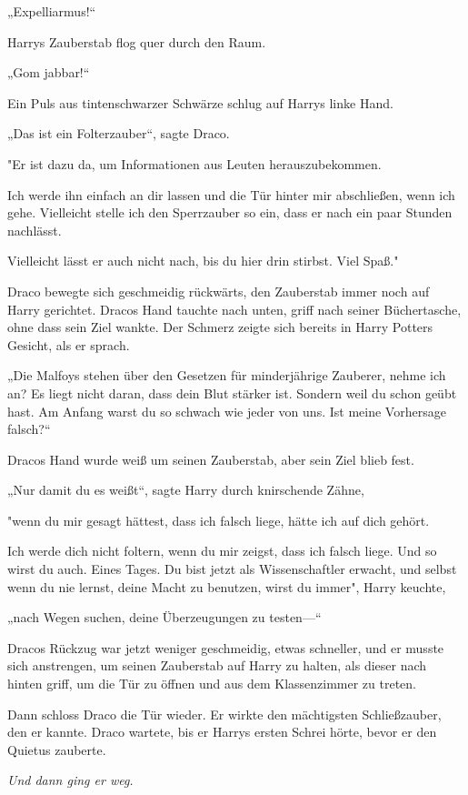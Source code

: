 {„Expelliarmus!“

Harrys Zauberstab flog quer durch den Raum.

„Gom jabbar!“

Ein Puls aus tintenschwarzer Schwärze schlug auf Harrys linke Hand.

„Das ist ein Folterzauber“, sagte Draco.

"Er ist dazu da, um Informationen aus Leuten herauszubekommen.

Ich werde ihn einfach an dir lassen und die Tür hinter mir abschließen, wenn ich gehe. Vielleicht stelle ich den Sperrzauber so ein, dass er nach ein paar Stunden nachlässt.

Vielleicht lässt er auch nicht nach, bis du hier drin stirbst. Viel Spaß."

Draco bewegte sich geschmeidig rückwärts, den Zauberstab immer noch auf Harry gerichtet. Dracos Hand tauchte nach unten, griff nach seiner Büchertasche, ohne dass sein Ziel wankte. Der Schmerz zeigte sich bereits in Harry Potters Gesicht, als er sprach.

„Die Malfoys stehen über den Gesetzen für minderjährige Zauberer, nehme ich an? Es liegt nicht daran, dass dein Blut stärker ist. Sondern weil du schon geübt hast. Am Anfang warst du so schwach wie jeder von uns. Ist meine Vorhersage falsch?“

Dracos Hand wurde weiß um seinen Zauberstab, aber sein Ziel blieb fest.

„Nur damit du es weißt“, sagte Harry durch knirschende Zähne,

"wenn du mir gesagt hättest, dass ich falsch liege, hätte ich auf dich gehört.

Ich werde dich nicht foltern, wenn du mir zeigst, dass ich falsch liege. Und so wirst du auch. Eines Tages. Du bist jetzt als Wissenschaftler erwacht, und selbst wenn du nie lernst, deine Macht zu benutzen, wirst du immer", Harry keuchte,

„nach Wegen suchen, deine Überzeugungen zu testen—“

Dracos Rückzug war jetzt weniger geschmeidig, etwas schneller, und er musste sich anstrengen, um seinen Zauberstab auf Harry zu halten, als dieser nach hinten griff, um die Tür zu öffnen und aus dem Klassenzimmer zu treten.

Dann schloss Draco die Tür wieder. Er wirkte den mächtigsten Schließzauber, den er kannte. Draco wartete, bis er Harrys ersten Schrei hörte, bevor er den Quietus zauberte.

\emph{Und dann ging er weg.}

}
